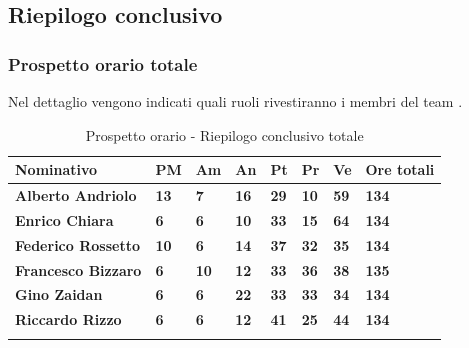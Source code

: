 \subsection{Riepilogo conclusivo}
\subsubsection{Prospetto orario totale}
Nel dettaglio vengono indicati quali ruoli rivestiranno i membri del team 
\GRUPPO.
\begin{center}
	\def\arraystretch{1.6}
	\bgroup
	\begin{longtable}{| p{4cm} | p{1cm} | p{1cm} | p{1cm} | p{1cm}| p{1cm} | 
			p{1cm} | p{1.7cm}|}
		\hline
		\textbf{Nominativo} & \textbf{PM} & \textbf{Am} & \textbf{An} & 
		\textbf{Pt} & \textbf{Pr} & \textbf{Ve} & \textbf{Ore totali}\\ 
		
		\hline \hline  
		
		\textbf{Alberto Andriolo} & \textbf{13} & \textbf{7} & \textbf{16} & 
		\textbf{29} & \textbf{10} & \textbf{59} & \textbf{134}\\ 
		\hline 
		
		\textbf{Enrico Chiara} & \textbf{6} & \textbf{6} & \textbf{10} & 
		\textbf{33} & \textbf{15} & \textbf{64} & \textbf{134}\\ 
		\hline 
		
		\textbf{Federico Rossetto} & \textbf{10} & \textbf{6} & \textbf{14} & 
		\textbf{37} & \textbf{32} & \textbf{35} & \textbf{134}\\ 
		\hline 
		
		\textbf{Francesco Bizzaro} & \textbf{6} & \textbf{10} & \textbf{12} & 
		\textbf{33} & \textbf{36} & \textbf{38} & \textbf{135}\\ 
		\hline 
		
		\textbf{Gino Zaidan} & \textbf{6} & \textbf{6} & \textbf{22} & 
		\textbf{33} & \textbf{33} & \textbf{34} & \textbf{134}\\ 
		\hline 
		
		\textbf{Riccardo Rizzo} & \textbf{6} & \textbf{6} & \textbf{12} & 
		\textbf{41} & \textbf{25} & \textbf{44} & \textbf{134}\\ 
		\hline 
		
		\hline 
		
		\caption{Prospetto orario - Riepilogo conclusivo totale}
	\end{longtable}
	\egroup
\end{center}
